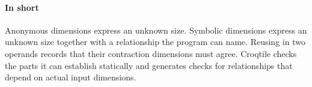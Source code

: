 \paragraph*{In short}

Anonymous dimensions express an unknown size. Symbolic dimensions express an unknown size together with a relationship the program can name. Reusing \co@K@ in two operands records that their contraction dimensions must agree. Croqtile checks the parts it can establish statically and generates checks for relationships that depend on actual input dimensions.
